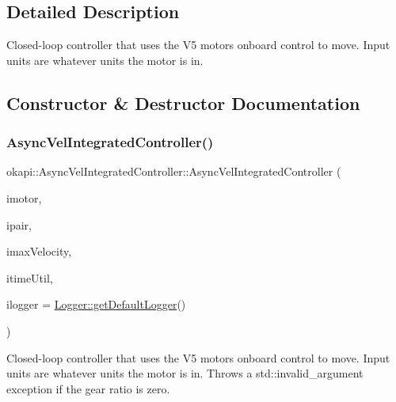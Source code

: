 \subsection{Detailed Description}
Closed-\/loop controller that uses the V5 motor\textquotesingle{}s onboard control to move. Input units are whatever units the motor is in. 

\subsection{Constructor \& Destructor Documentation}
\mbox{\label{classokapi_1_1AsyncVelIntegratedController_a8b272566332633b02aca9c8ea585e8f9}} 
\subsubsection{\texorpdfstring{AsyncVelIntegratedController()}{AsyncVelIntegratedController()}}
{\footnotesize\ttfamily okapi\+::\+Async\+Vel\+Integrated\+Controller\+::\+Async\+Vel\+Integrated\+Controller (\begin{DoxyParamCaption}\item[{const std\+::shared\+\_\+ptr$<$ \mbox{\hyperlink{classokapi_1_1AbstractMotor}{Abstract\+Motor}} $>$ \&}]{imotor,  }\item[{const \mbox{\hyperlink{structokapi_1_1AbstractMotor_1_1GearsetRatioPair}{Abstract\+Motor\+::\+Gearset\+Ratio\+Pair}} \&}]{ipair,  }\item[{std\+::int32\+\_\+t}]{imax\+Velocity,  }\item[{const \mbox{\hyperlink{classokapi_1_1TimeUtil}{Time\+Util}} \&}]{itime\+Util,  }\item[{const std\+::shared\+\_\+ptr$<$ \mbox{\hyperlink{classokapi_1_1Logger}{Logger}} $>$ \&}]{ilogger = {\ttfamily \mbox{\hyperlink{classokapi_1_1Logger_a5053cf778b4b55acba788a3797dc96d2}{Logger\+::get\+Default\+Logger}}()} }\end{DoxyParamCaption})}

Closed-\/loop controller that uses the V5 motor\textquotesingle{}s onboard control to move. Input units are whatever units the motor is in. Throws a std\+::invalid\+\_\+argument exception if the gear ratio is zero.


